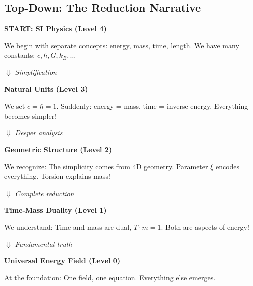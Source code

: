 	\subsection{Top-Down: The Reduction Narrative}
	
	\begin{philosophical}
		\textbf{START: SI Physics (Level 4)}
		
		We begin with separate concepts: energy, mass, time, length. We have many constants: $c, \hbar, G, k_B, \ldots$
		
		\vspace{0.3cm}
		
		$\Downarrow$ \textit{Simplification}
		
		\vspace{0.3cm}
		
		\textbf{Natural Units (Level 3)}
		
		We set $c = \hbar = 1$. Suddenly: energy = mass, time = inverse energy. Everything becomes simpler!
		
		\vspace{0.3cm}
		
		$\Downarrow$ \textit{Deeper analysis}
		
		\vspace{0.3cm}
		
		\textbf{Geometric Structure (Level 2)}
		
		We recognize: The simplicity comes from 4D geometry. Parameter $\xi$ encodes everything. Torsion explains mass!
		
		\vspace{0.3cm}
		
		$\Downarrow$ \textit{Complete reduction}
		
		\vspace{0.3cm}
		
		\textbf{Time-Mass Duality (Level 1)}
		
		We understand: Time and mass are dual, $T \cdot m = 1$. Both are aspects of energy!
		
		\vspace{0.3cm}
		
		$\Downarrow$ \textit{Fundamental truth}
		
		\vspace{0.3cm}
		
		\textbf{Universal Energy Field (Level 0)}
		
		At the foundation: One field, one equation. Everything else emerges.
	\end{philosophical}
	
